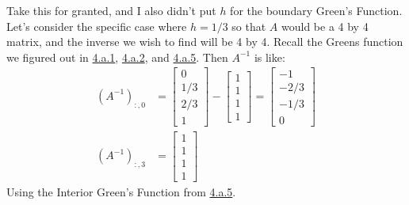 \documentclass[]{article}
\begin{document}
        Take this for granted, and I also didn't put $h$ for the boundary Green's Function. Let's consider the specific case where $h = 1/3$ so that $A$ would be a 4 by 4 matrix, and the inverse we wish to find will be 4 by 4. Recall the Greens function we figured out in \hyperref[eqn:4.a.1]{4.a.1}, \hyperref[eqn:4.a.2]{4.a.2}, and \hyperref[eqn:4.a.5]{4.a.5}. Then $A^{-1}$ is like: 
        \begin{align*}\tag{4.b.3}\label{eqn:4.b.3}
            (A^{-1})_{:, 0} &= \begin{bmatrix}
                0 \\1/3 \\2/3\\ 1
            \end{bmatrix}
            - \begin{bmatrix}
                1 \\1 \\1\\ 1 
            \end{bmatrix}
            = 
            \begin{bmatrix}
                -1\\ -2/3\\ -1/3\\ 0
            \end{bmatrix}
            \\
            (A^{-1})_{:, 3} &= 
            \begin{bmatrix}
                1 \\ 1 \\ 1 \\ 1
            \end{bmatrix}
        \end{align*}
        Using the Interior Green's Function from \hyperref[eqn:4.a.5]{4.a.5}. 
\end{document}
